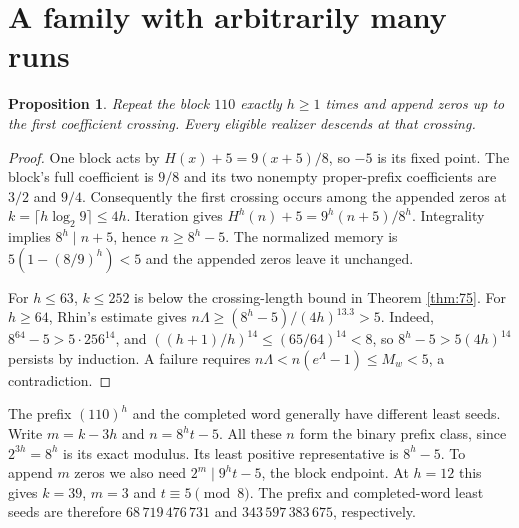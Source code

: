 \documentclass[11pt,a4paper]{article}
\theoremstyle{plain}\newtheorem{theorem}{Theorem}\newtheorem{proposition}[theorem]{Proposition}
\theoremstyle{definition}\newtheorem{example}[theorem]{Example}
\theoremstyle{remark}\newtheorem{remark}[theorem]{Remark}
\begin{document}
\section{A family with arbitrarily many runs}
\begin{proposition}\label{prop:110}
Repeat the block $110$ exactly $h\ge1$ times and append zeros up to the first coefficient
crossing. Every eligible realizer descends at that crossing.
\end{proposition}
\begin{proof}
One block acts by $H(x)+5=9(x+5)/8$, so $-5$ is its fixed point.
The block's full coefficient is $9/8$ and its two nonempty proper-prefix coefficients
are $3/2$ and $9/4$. Consequently the first crossing occurs among the appended zeros
at $k=\lceil h\log_2 9\rceil\le4h$. Iteration gives
$H^h(n)+5=9^h(n+5)/8^h$. Integrality implies $8^h\mid n+5$, hence $n\ge8^h-5$.
The normalized memory is $5(1-(8/9)^h)<5$ and the appended zeros leave it unchanged.

For $h\le63$, $k\le252$ is below the crossing-length bound in Theorem \ref{thm:75}.
For $h\ge64$, Rhin's estimate gives $n\Lambda\ge(8^h-5)/(4h)^{13.3}>5$.
Indeed, $8^{64}-5>5\cdot256^{14}$, and $((h+1)/h)^{14}\le(65/64)^{14}<8$,
so $8^h-5>5(4h)^{14}$ persists by induction. A failure requires
$n\Lambda<n(e^\Lambda-1)\le M_w<5$, a contradiction.
\end{proof}
The prefix $(110)^h$ and the completed word generally have different least seeds.
Write $m=k-3h$ and $n=8^h t-5$. All these $n$ form the binary prefix class,
since $2^{3h}=8^h$ is its exact modulus. Its least positive representative is $8^h-5$.
To append $m$ zeros we also need $2^m\mid 9^h t-5$, the block endpoint.
At $h=12$ this gives $k=39$, $m=3$ and $t\equiv5\pmod8$. The prefix and completed-word
least seeds are therefore $68\,719\,476\,731$ and $343\,597\,383\,675$, respectively.
\end{document}
